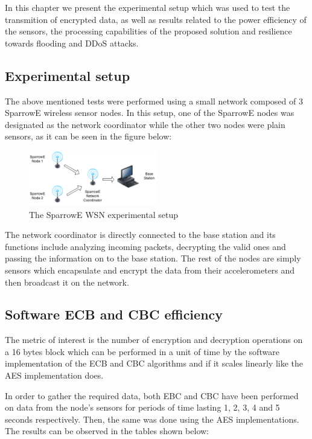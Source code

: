 In this chapter we present the experimental setup which was 
used to test the transmition of encrypted data, as well as results 
related to the power efficiency of the sensors, the processing 
capabilities of the proposed solution and resilience towards 
flooding and DDoS attacks.

\subsection{Experimental setup}

The above mentioned tests were performed using a small network 
composed of 3 SparrowE wireless sensor nodes. In this setup, 
one of the SparrowE nodes was designated as the network coordinator 
while the other two nodes were plain sensors, as it can be seen in 
the figure below:

\begin{figure}[ht] \centering
  \includegraphics[width=0.5\textwidth]{img/experimental-setup.png}
  \caption{The SparrowE WSN experimental setup}
\end{figure}

The network coordinator is directly connected to the base station and 
its functions include analyzing incoming packets, decrypting the valid 
ones and passing the information on to the base station. The rest of the 
nodes are simply sensors which encapsulate and encrypt the data from their 
accelerometers and then broadcast it on the network.

\subsection{Software ECB and CBC efficiency}

The metric of interest is the number of encryption and decryption operations 
on a 16 bytes block which can be performed in a unit of time by the software 
implementation of the ECB and CBC algorithms and if it scales linearly like 
the AES implementation does.

In order to gather the required data, both EBC and CBC have been performed on 
data from the node's sensors for periods of time lasting 1, 2, 3, 4 and 5 seconds 
respectively. Then, the same was done using the AES implementations. The results 
can be observed in the tables shown below:

